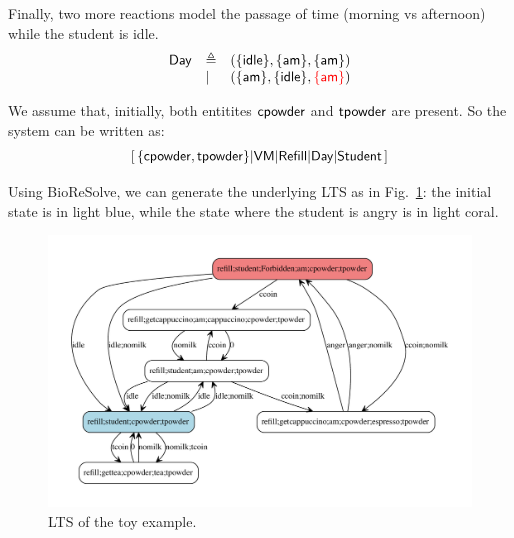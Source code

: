 Finally, two more reactions model the passage of time (morning vs afternoon) while the student is idle.
\[
\begin{array}{lll}
\mathsf{Day} & \triangleq & (\{\mathsf{idle}\},\{\mathsf{am}\},\{\mathsf{am}\})\\
& | & (\{\mathsf{am}\},\{\mathsf{idle}\},\textcolor{red}{\{\mathsf{am}\}})
\end{array}
\]

We assume that, initially, both entitites $\mathsf{cpowder}$ and $\mathsf{tpowder}$ are present.
So the system can be written as:
\[
[\,\{\mathsf{cpowder},\mathsf{tpowder}\} 
| \mathsf{VM}
| \mathsf{Refill}
| \mathsf{Day}
| \mathsf{Student}
\,]
\]

Using BioReSolve, we can generate the underlying LTS as in Fig.~\ref{fig:toylts}: the initial state is in light blue, while the state where the student is angry is in light coral.

\begin{figure}
\includegraphics[scale=.3]{toylts}
\caption{LTS of the toy example.\label{fig:toylts}}
\end{figure}
